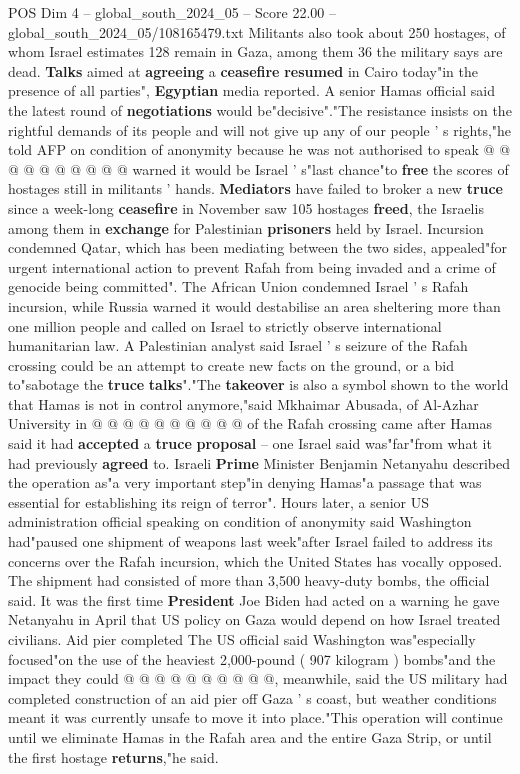 \begin{textsample}{POS Dim 4 – global\_south\_2024\_05 – Score 22.00 – global\_south\_2024\_05/108165479.txt}
Militants also took about 250 hostages, of whom Israel estimates 128 remain in Gaza, among them 36 the military says are dead. \textbf{Talks} aimed at \textbf{agreeing} a \textbf{ceasefire} \textbf{resumed} in Cairo today"in the presence of all parties", \textbf{Egyptian} media reported.
A senior Hamas official said the latest round of \textbf{negotiations} would be"decisive"."The resistance insists on the rightful demands of its people and will not give up any of our people ' s rights,"he told AFP on condition of anonymity because he was not authorised to speak @ @ @ @ @ @ @ @ @ @ warned it would be Israel ' s"last chance"to \textbf{free} the scores of hostages still in militants ' hands. \textbf{Mediators} have failed to broker a new \textbf{truce} since a week-long \textbf{ceasefire} in November saw 105 hostages \textbf{freed}, the Israelis among them in \textbf{exchange} for Palestinian \textbf{prisoners} held by Israel.
Incursion condemned Qatar, which has been mediating between the two sides, appealed"for urgent international action to prevent Rafah from being invaded and a crime of genocide being committed".
The African Union condemned Israel ' s Rafah incursion, while Russia warned it would destabilise an area sheltering more than one million people and called on Israel to strictly observe international humanitarian law.
A Palestinian analyst said Israel ' s seizure of the Rafah crossing could be an attempt to create new facts on the ground, or a bid to"sabotage the \textbf{truce} \textbf{talks}"."The \textbf{takeover} is also a symbol shown to the world that Hamas is not in control anymore,"said Mkhaimar Abusada, of Al-Azhar University in @ @ @ @ @ @ @ @ @ @ of the Rafah crossing came after Hamas said it had \textbf{accepted} a \textbf{truce} \textbf{proposal} -- one Israel said was"far"from what it had previously \textbf{agreed} to.
Israeli \textbf{Prime} Minister Benjamin Netanyahu described the operation as"a very important step"in denying Hamas"a passage that was essential for establishing its reign of terror".
Hours later, a senior US administration official speaking on condition of anonymity said Washington had"paused one shipment of weapons last week"after Israel failed to address its concerns over the Rafah incursion, which the United States has vocally opposed.
The shipment had consisted of more than 3,500 heavy-duty bombs, the official said.
It was the first time \textbf{President} Joe Biden had acted on a warning he gave Netanyahu in April that US policy on Gaza would depend on how Israel treated civilians.
Aid pier completed The US official said Washington was"especially focused"on the use of the heaviest 2,000-pound ( 907 kilogram ) bombs"and the impact they could @ @ @ @ @ @ @ @ @ @, meanwhile, said the US military had completed construction of an aid pier off Gaza ' s coast, but weather conditions meant it was currently unsafe to move it into place."This operation will continue until we eliminate Hamas in the Rafah area and the entire Gaza Strip, or until the first hostage \textbf{returns},"he said.

\end{textsample}
